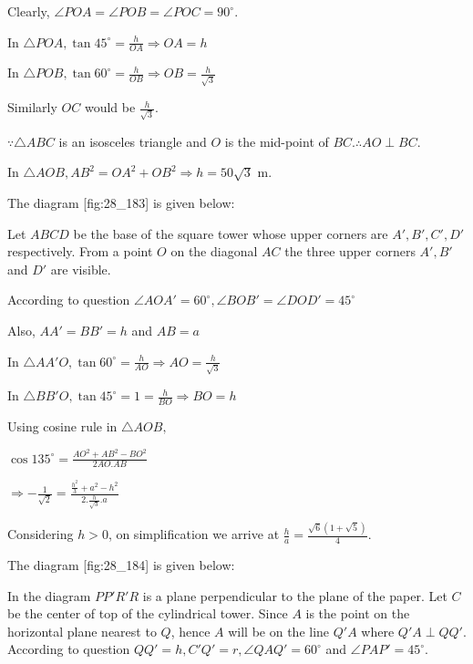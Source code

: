   Clearly, $\angle POA = \angle POB = \angle POC = 90^\circ$.

  In $\triangle POA, \tan45^\circ = \frac{h}{OA}\Rightarrow OA = h$

  In $\triangle POB, \tan60^\circ = \frac{h}{OB}\Rightarrow OB = \frac{h}{\sqrt{3}}$

  Similarly $OC$ would be $\frac{h}{\sqrt{3}}$.

  $\because \triangle ABC$ is an isosceles triangle and $O$ is the mid-point of
  $BC. \therefore AO\perp BC$.

  In $\triangle AOB, AB^2 = OA^2 + OB^2 \Rightarrow h = 50\sqrt{3}$ m.

\item The diagram [fig:28_183] is given below:

  \startplacefigure[reference=fig:28_183]
    \externalfigure[28_183.pdf]
  \stopplacefigure

  Let $ABCD$ be the base of the square tower whose upper corners are $A', B', C', D'$
  respectively. From a point $O$ on the diagonal $AC$ the three upper corners $A', B'$
  and $D'$ are visible.

  According to question $\angle AOA' = 60^\circ, \angle BOB' = \angle DOD' = 45^\circ$

  Also, $AA' = BB' = h$ and $AB = a$

  In $\triangle AA'O, \tan60^\circ = \frac{h}{AO}\Rightarrow AO = \frac{h}{\sqrt{3}}$

  In $\triangle BB'O, \tan45^\circ = 1= \frac{h}{BO} \Rightarrow BO = h$

  Using cosine rule in $\triangle AOB,$

  $\cos135^\circ = \frac{AO^2 + AB^2 - BO^2}{2AO.AB}$

  $\Rightarrow -\frac{1}{\sqrt{2}} = \frac{\frac{h^2}{3} + a^2 - h^2}{2.\frac{h}{\sqrt{3}}.a}$

  Considering $h > 0$, on simplification we arrive at $\frac{h}{a} = \frac{\sqrt{6}(1 +
    \sqrt{5})}{4}$.

\item The diagram [fig:28_184] is given below:

  \startplacefigure[reference=fig:28_184]
    \externalfigure[28_184.pdf]
  \stopplacefigure

  In the diagram $PP'R'R$ is a plane perpendicular to the plane of the paper. Let $C$ be the
  center of top of the cylindrical tower. Since $A$ is the point on the horizontal plane nearest to
  $Q$, hence $A$ will be on the line $Q'A$ where $Q'A\perp QQ'$. According to
  question $QQ' = h, C'Q' = r, \angle QAQ' = 60^\circ$ and $\angle PAP' = 45^\circ$.


